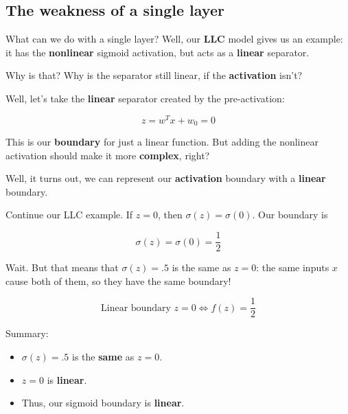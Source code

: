\subsection*{The weakness of a single layer}
    
        What can we do with a single layer? Well, our \textbf{LLC} model gives us an example: it has the \textbf{nonlinear} sigmoid activation, but acts as a \textbf{linear} separator.
        
        Why is that? Why is the separator still linear, if the \textbf{activation} isn't?
        
        Well, let's take the \textbf{linear} separator created by the pre-activation:
        
        \begin{equation}
            z = w^T x + w_0 = 0 
        \end{equation}
        
        This is our \textbf{boundary} for just a linear function. But adding the nonlinear activation should make it more \textbf{complex}, right? 
        
        Well, it turns out, we can represent our \textbf{activation} boundary with a \textbf{linear} boundary.
        
        \miniex Continue our LLC example. If $z=0$, then $\sigma(z) = \sigma(0)$. Our boundary is
        
        \begin{equation}
            \sigma(z)=\sigma(0)=\frac{1}{2}
        \end{equation}
        
        Wait. But that means that $\sigma(z)=.5$ is the same as $z=0$: the same inputs $x$ cause both of them, so they have the same boundary!
        
        \begin{equation}
            \text{Linear boundary } z=0 \Longleftrightarrow f(z)=\frac{1}{2}
        \end{equation}
        
        Summary:
        
        \begin{itemize}
            \item $\sigma(z)=.5$ is the \textbf{same} as $z=0$.
            \item $z=0$ is \textbf{linear}.
            \item Thus, our sigmoid boundary is \textbf{linear}.
        \end{itemize}
        
